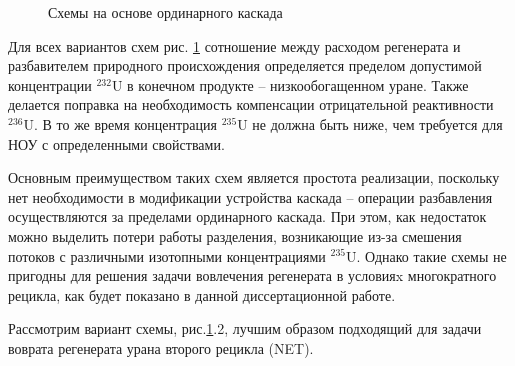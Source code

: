\begin{figure}[ht]
  \caption{Схемы на основе ординарного каскада}\label{fig:diagram1}
\end{figure}

Для всех вариантов схем рис. \ref{fig:diagram1} сотношение между расходом регенерата и разбавителем природного происхождения определяется пределом допустимой концентрации $^{232}$U в конечном продукте -- низкообогащенном уране. Также делается поправка на необходимость компенсации отрицательной реактивности $^{236}$U. В то же время концентрация $^{235}$U не должна быть ниже, чем требуется для НОУ с определенными свойствами.

Основным преимуществом таких схем является простота реализации, поскольку нет необходимости в модификации устройства каскада -- операции разбавления осуществляются за пределами  ординарного каскада. При этом, как недостаток можно выделить потери работы разделения, возникающие из-за смешения потоков с различными изотопными концентрациями $^{235}$U. 
Однако такие схемы не пригодны для решения задачи вовлечения регенерата в условияx многократного рецикла, как будет показано в данной диссертационной работе.

Рассмотрим вариант схемы, рис.\ref{fig:diagram1}.2, лучшим образом подходящий для задачи воврата регенерата урана второго рецикла (NET).

